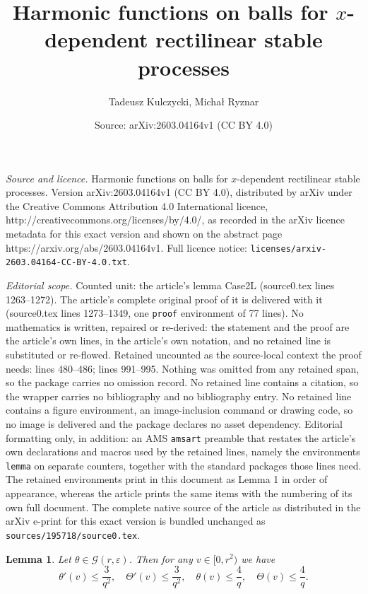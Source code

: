 \documentclass[10pt,a4paper]{amsart}
\title{Harmonic functions on balls for $x$-dependent rectilinear stable processes}
\author{Tadeusz Kulczycki, Micha{\l} Ryznar}
\date{Source: arXiv:2603.04164v1 (CC BY 4.0)}
\newtheorem{lemma}{Lemma}
\newcommand{\calG}{\mathcal{G}}
\newcommand{\eps}{\varepsilon}
\begin{document}
\maketitle

\noindent\emph{Source and licence.} Harmonic functions on balls for $x$-dependent rectilinear stable processes. Version arXiv:2603.04164v1 (CC BY 4.0), distributed by arXiv under the Creative Commons Attribution 4.0 International licence, http://creativecommons.org/licenses/by/4.0/, as recorded in the arXiv licence metadata for this exact version and shown on the abstract page https://arxiv.org/abs/2603.04164v1. Full licence notice: \texttt{licenses/arxiv-2603.04164-CC-BY-4.0.txt}.\par\smallskip

\noindent\textit{Editorial scope.} Counted unit: the article's lemma Case2L (source0.tex lines 1263--1272). The article's complete original proof of it is delivered with it (source0.tex lines 1273--1349, one \texttt{proof} environment of 77 lines). No mathematics is written, repaired or re-derived: the statement and the proof are the article's own lines, in the article's own notation, and no retained line is substituted or re-flowed.  Retained uncounted as the source-local context the proof needs: lines 480--486; lines 991--995.  Nothing was omitted from any retained span, so the package carries no omission record.  No retained line contains a citation, so the wrapper carries no bibliography and no bibliography entry.  No retained line contains a figure environment, an image-inclusion command or drawing code, so no image is delivered and the package declares no asset dependency.  Editorial formatting only, in addition: an AMS \texttt{amsart} preamble that restates the article's own declarations and macros used by the retained lines, namely the environments \texttt{lemma} on separate counters, together with the standard packages those lines need.  The retained environments print in this document as Lemma 1 in order of appearance, whereas the article prints the same items with the numbering of its own full document.  The complete native source of the article as distributed in the arXiv e-print for this exact version is bundled unchanged as \texttt{sources/195718/source0.tex}.
\begin{lemma}
\label{theta_estimates}
Let $\theta \in \calG(r,\eps)$. Then for any $v \in [0,r^2)$ we have
$$
\theta'(v) \le \frac{3}{q^2}, \quad \Theta'(v) \le \frac{3}{q^2}, \quad \theta(v) \le \frac{4}{q}, \quad \Theta(v) \le \frac{4}{q}.
$$
\end{lemma}
\end{document}
